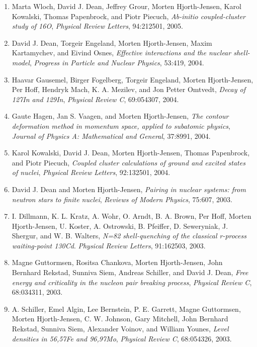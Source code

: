 \documentclass[%
oneside,                 %
final,                   %
10pt]{article}
\begin{document}
\begin{enumerate}
\item Marta Wloch, David J. Dean, Jeffrey Grour, Morten Hjorth-Jensen, Karol   Kowalski, Thomas Papenbrock, and Piotr Piecuch, \emph{Ab-initio coupled-cluster study of 16O},  \emph{Physical Review Letters}, 94:212501, 2005. 

\item David J. Dean, Torgeir Engeland, Morten Hjorth-Jensen, Maxim Kartamychev, and   Eivind Osnes, \emph{Effective interactions and the nuclear shell-model},  \emph{Progress in Particle and Nuclear Physics}, 53:419, 2004. 

\item Haavar Gausemel, Birger Fogelberg, Torgeir Engeland, Morten Hjorth-Jensen,   Per Hoff, Hendryk Mach, K. A. Mezilev, and Jon Petter Omtvedt, \emph{Decay of 127In and 129In},  \emph{Physical Review C}, 69:054307, 2004. 

\item Gaute Hagen, Jan S. Vaagen, and Morten Hjorth-Jensen,  \emph{The contour deformation method in momentum space, applied to   subatomic physics},  \emph{Journal of Physics A: Mathematical and General}, 37:8991, 2004. 

\item Karol Kowalski, David J. Dean, Morten Hjorth-Jensen, Thomas Papenbrock, and   Piotr Piecuch, \emph{Coupled cluster calculations of ground and excited states of nuclei},  \emph{Physical Review Letters}, 92:132501, 2004. 

\item David J. Dean and Morten Hjorth-Jensen,  \emph{Pairing in nuclear systems: from neutron stars to finite nuclei}, \emph{Reviews of Modern Physics}, 75:607, 2003. 

\item I. Dillmann, K. L. Kratz, A. Wohr, O. Arndt, B. A. Brown, Per Hoff, Morten   Hjorth-Jensen, U. Koster, A. Ostrowski, B. Pfeiffer, D. Seweryniak,   J. Shergur, and W. B. Walters,  \emph{N=82 shell-quenching of the classical r-process waiting-point 130Cd}.  \emph{Physical Review Letters}, 91:162503, 2003. 

\item Magne Guttormsen, Rositsa Chankova, Morten Hjorth-Jensen, John Bernhard   Rekstad, Sunniva Siem, Andreas Schiller, and David J. Dean, \emph{Free energy and criticality in the nucleon pair breaking   process},  \emph{Physical Review C}, 68:034311, 2003. 

\item A. Schiller, Emel Algin, Lee Bernstein, P. E. Garrett, Magne Guttormsen, Morten   Hjorth-Jensen, C. W. Johnson, Gary Mitchell, John Bernhard Rekstad, Sunniva   Siem, Alexander Voinov, and William Younes, \emph{Level densities in 56,57Fe and 96,97Mo},  \emph{Physical Review C}, 68:054326, 2003. 


\end{enumerate}
\end{document}
